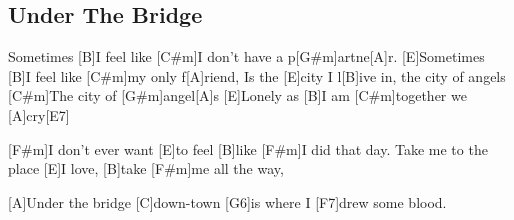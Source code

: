 \subsection*{Under The Bridge   }
\begin{guitar}
[E]Sometimes [B]I feel like [C#m]I don't have a p[G#m]artne[A]r.
[E]Sometimes [B]I feel like [C#m]my only f[A]riend,
Is the [E]city I l[B]ive in, the city of angels
[C#m]The city of [G#m]angel[A]s
[E]Lonely as [B]I am [C#m]together we [A]cry[E7]   
 


[F#m]I don't ever want [E]to feel [B]like [F#m]I did that day.
Take me to the place [E]I love, [B]take [F#m]me all the way,



[A]Under the bridge [C]down-town
[G6]is where I [F7]drew some blood.
\end{guitar}
